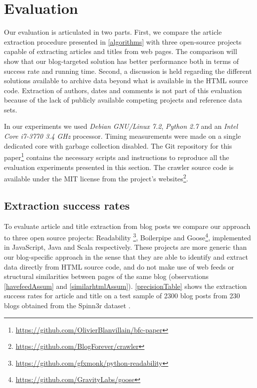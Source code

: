 \section{Evaluation}
\label{evaluation}

Our evaluation is articulated in two parts. First, we compare the article extraction procedure presented in \autoref{algorithms} with three open-source projects capable of extracting articles and titles from web pages. The comparison will show that our blog-targeted solution has better performance both in terms of success rate and running time. Second, a discussion is held regarding the different solutions available to archive data beyond what is available in the HTML source code. Extraction of authors, dates and comments is not part of this evaluation because of the lack of publicly available competing projects and reference data sets.

In our experiments we used \emph{Debian GNU/Linux 7.2}, \emph{Python 2.7} and an \emph{Intel Core i7-3770 3.4 GHz} processor. Timing measurements were made on a single dedicated core with garbage collection disabled. The Git repository for this paper\footnote{\url{https://github.com/OlivierBlanvillain/bfc-paper}} contains the necessary scripts and instructions to reproduce all the evaluation experiments presented in this section. The crawler source code is available under the MIT license from the project's websites\footnote{\url{https://github.com/BlogForever/crawler}}.

\subsection{Extraction success rates}
To evaluate article and title extraction from blog posts we compare our approach to three open source projects: Readability \footnote{\url{https://github.com/gfxmonk/python-readability}}, Boilerpipe \cite{kohlschuetter2010} and Goose\footnote{\url{https://github.com/GravityLabs/goose}}, implemented in JavaScript, Java and Scala respectively. These projects are more generic than our blog-specific approach in the sense that they are able to identify and extract data directly from HTML source code, and do not make use of web feeds or structural similarities between pages of the same blog (observations \ref{havefeedAssum} and \ref{similarhtmlAssum}). \autoref{precisionTable} shows the extraction success rates for article and title on a test sample of 2300 blog posts from 230 blogs obtained from the Spinn3r dataset \cite{burton2011}.

